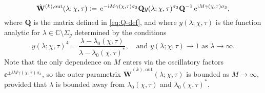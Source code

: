 \begin{equation}
\dot{\mathbf{W}}^{(k),\mathrm{out}}(\lambda;\chi,\tau)\vcentcolon=\\
\,\mathrm{e}^{-\mathrm{i} M\gamma(\chi,\tau)\sigma_3}\mathbf{Q}y(\lambda;\chi,\tau)^{\sigma_3}\mathbf{Q}^{-1}\,\mathrm{e}^{\mathrm{i} M\gamma(\chi,\tau)\sigma_3},
\label{eq:outer-parametrix-Schi-Stau-ALT}
\end{equation}
where $\mathbf{Q}$ is the matrix defined in \eqref{eq:Q-def}, and where $y(\lambda;\chi,\tau)$ is the function analytic for $\lambda\in\mathbb{C}\setminus\Sigma_g$ determined by the conditions
\begin{equation}
y(\lambda;\chi,\tau)^4=\frac{\lambda-\lambda_0(\chi,\tau)}{\lambda-\lambda_0(\chi,\tau)^*},\quad\text{and $y(\lambda;\chi,\tau)\to 1$ as $\lambda\to\infty$}.
\label{eq:y-def}
\end{equation}
Note that the only dependence on 
$M$
enters via the oscillatory factors 
$\ee^{\pm\ii M\gamma(\chi,\tau)\sigma_3}$,
so the outer parametrix
$\dot{\mathbf{W}}^{(k),\mathrm{out}}(\lambda;\chi,\tau)$
is bounded as 
$M\to\infty$,
provided that $\lambda$ is bounded away from $\lambda_0(\chi,\tau)$ and $\lambda_0(\chi,\tau)^*$.

